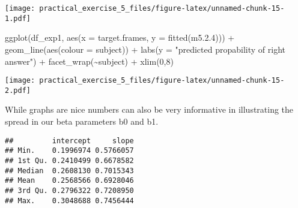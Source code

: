 \documentclass[
]{article}
\newenvironment{Shaded}{\begin{snugshade}}{\end{snugshade}}
\newcommand{\AttributeTok}[1]{\textcolor[rgb]{0.77,0.63,0.00}{#1}}
\newcommand{\CommentTok}[1]{\textcolor[rgb]{0.56,0.35,0.01}{\textit{#1}}}
\newcommand{\DecValTok}[1]{\textcolor[rgb]{0.00,0.00,0.81}{#1}}
\newcommand{\FloatTok}[1]{\textcolor[rgb]{0.00,0.00,0.81}{#1}}
\newcommand{\FunctionTok}[1]{\textcolor[rgb]{0.00,0.00,0.00}{#1}}
\newcommand{\NormalTok}[1]{#1}
\newcommand{\OtherTok}[1]{\textcolor[rgb]{0.56,0.35,0.01}{#1}}
\newcommand{\SpecialCharTok}[1]{\textcolor[rgb]{0.00,0.00,0.00}{#1}}
\newcommand{\StringTok}[1]{\textcolor[rgb]{0.31,0.60,0.02}{#1}}
\begin{document}
\texttt{[image: practical\_exercise\_5\_files/figure-latex/unnamed-chunk-15-1.pdf]}

\begin{Shaded}
\begin{Highlighting}[]
\FunctionTok{ggplot}\NormalTok{(df\_exp1, }\FunctionTok{aes}\NormalTok{(}\AttributeTok{x =}\NormalTok{ target.frames, }\AttributeTok{y =} \FunctionTok{fitted}\NormalTok{(m5.}\FloatTok{2.4}\NormalTok{))) }\SpecialCharTok{+} \FunctionTok{geom\_line}\NormalTok{(}\FunctionTok{aes}\NormalTok{(}\AttributeTok{colour =}\NormalTok{ subject)) }\SpecialCharTok{+} \FunctionTok{labs}\NormalTok{(}\AttributeTok{y =} \StringTok{"predicted propability of right answer"}\NormalTok{) }\SpecialCharTok{+} \FunctionTok{facet\_wrap}\NormalTok{(}\SpecialCharTok{\textasciitilde{}}\NormalTok{subject) }\SpecialCharTok{+} \FunctionTok{xlim}\NormalTok{(}\DecValTok{0}\NormalTok{,}\DecValTok{8}\NormalTok{)}
\end{Highlighting}
\end{Shaded}

\texttt{[image: practical\_exercise\_5\_files/figure-latex/unnamed-chunk-15-2.pdf]}

While graphs are nice numbers can also be very informative in
illustrating the spread in our beta parameters b0 and b1.

\begin{Shaded}
\end{Shaded}

\begin{verbatim}
##         intercept     slope
## Min.    0.1996974 0.5766057
## 1st Qu. 0.2410499 0.6678582
## Median  0.2608130 0.7015343
## Mean    0.2568566 0.6928046
## 3rd Qu. 0.2796322 0.7208950
## Max.    0.3048688 0.7456444
\end{verbatim}
\end{document}
